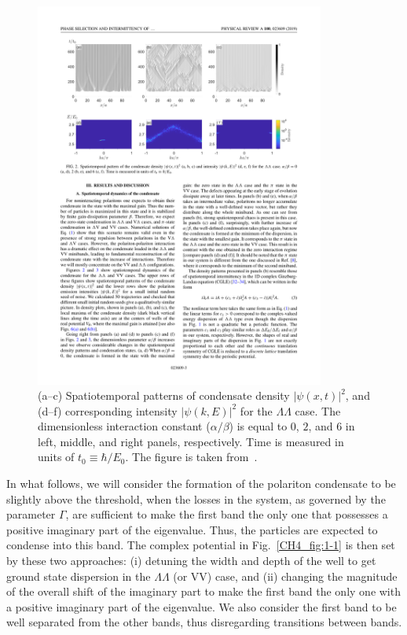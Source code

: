 \begin{figure}[!htb]
\centering
\includegraphics[width=0.85\textwidth]{Fig/Ch4/fig2.pdf}
\caption[Spatiotemporal patterns of the condensate density for the $\Lambda\Lambda$ case]{(a--c) Spatiotemporal patterns of condensate density $|\psi(x,t)|^2$, and (d--f) corresponding intensity $|\psi(k,E)|^2$ for the $\Lambda\Lambda$ case. The dimensionless interaction constant ($\alpha/\beta$) is equal to $0$, $2$, and $6$ in left, middle, and right panels, respectively. Time is measured in units of $t_0 \equiv \hbar/E_0$. The figure is taken from~\cite{Yoon:2019aa}.}
\label{CH4_fig:2-1}
\end{figure}

In what follows, we will consider the formation of the polariton condensate to be slightly above the threshold, when the losses in the system, as governed by the parameter $\Gamma$, are sufficient to make the first band the only one that possesses a positive imaginary part of the eigenvalue.
Thus, the particles are expected to condense into this band.
The complex potential in Fig.~\ref{CH4_fig:1-1} is then set by these two approaches:
(i) detuning the width and depth of the well to get ground state dispersion in the $\Lambda\Lambda$ (or VV) case, and (ii) changing the magnitude of the overall shift of the imaginary part to make the first band the only one with a positive imaginary part of the eigenvalue.
We also consider the first band to be well separated from the other bands, thus disregarding transitions between bands.

